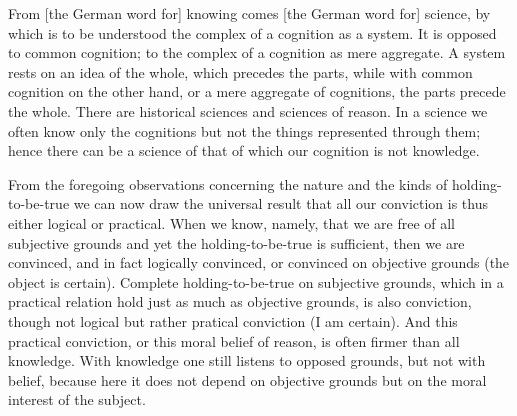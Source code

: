 From [the German word for] knowing comes [the German word for] science,
by which is to be understood the complex of a cognition as a system.
It is opposed to common cognition;
to the complex of a cognition as mere aggregate.
A system rests on an idea of the whole, which precedes the parts,
while with common cognition on the other hand,
or a mere aggregate of cognitions, the parts precede the whole.
There are historical sciences and sciences of reason.
In a science we often know only the cognitions but
not the things represented through them;
hence there can be a science of that of which
our cognition is not knowledge.

From the foregoing observations concerning
the nature and the kinds of holding-to-be-true
we can now draw the universal result that
all our conviction is thus either logical or practical.
When we know, namely, that we are free of all subjective grounds and
yet the holding-to-be-true is sufficient,
then we are convinced, and in fact logically convinced, or
convinced on objective grounds (the object is certain).
Complete holding-to-be-true on subjective grounds,
which in a practical relation hold just as much as objective grounds,
is also conviction, though not logical but rather pratical conviction (I am certain).
And this practical conviction, or this moral belief of reason,
is often firmer than all knowledge.
With knowledge one still listens to opposed grounds,
but not with belief, because here it does not depend
on objective grounds but on the moral interest of the subject.

